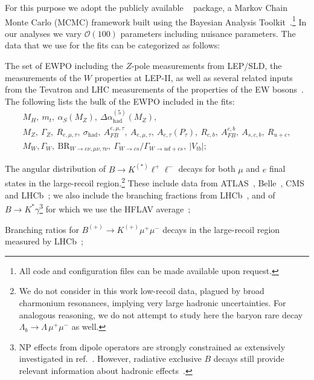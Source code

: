 For this purpose we adopt the publicly available \HEPfit~\cite{deBlas:2019okz} package, a Markov Chain Monte Carlo (MCMC) framework built using the Bayesian Analysis Toolkit~\cite{2009CoPhC.180.2197C}.\footnote{All code and configuration files can be made available upon request.} In our analyses we vary $\mathcal{O}(100)$ parameters including nuisance parameters. The data that we use for the fits can be categorized as follows:
\begin{itemize}
	\setlength\itemsep{0em}
	{\item The set of EWPO including the $Z$-pole measurements from LEP/SLD, the measurements of the $W$ properties at LEP-II, as well as several related inputs from the Tevatron and LHC measurements of the properties of the EW bosons~\cite{ALEPH:2005ab,Abe:2000uc,Group:2012gb,Schael:2013ita,Aaboud:2017svj,Khachatryan:2014iya,Abazov:2011ws}. The following lists the bulk of the EWPO included in the fits:
		\begin{gather*}
			M_H,~m_t,~\alpha_S(M_Z),~\Delta \alpha_{\mathrm{had}}^{(5)}(M_Z),\\
			M_{Z},~\Gamma_{Z},~R_{e,\mu,\tau},~\sigma_{\mathrm{had}}, ~A^{e,\mu,\tau}_{FB},~A_{e,\mu,\tau},~A_{e,\tau}(P_\tau),~ R_{c,b},~A^{c,b}_{FB},~A_{s,c,b},~R_{u+c}, \\
			M_{W},\Gamma_{W},~\mathrm{BR}_{W\to e \nu,\mu \nu,\tau \nu},~\Gamma_{W\to cs}/\Gamma_{W\to ud+cs},~\left|V_{tb}\right|;
		\end{gather*}
	}
	\item The angular distribution of $B\to K^{(*)}\ell^+\ell^-$ decays for both $\mu$ and $e$ final states in the large-recoil region.\footnote{We do not consider in this work low-recoil data, plagued by broad charmonium resonances, implying very large hadronic uncertainties. For analogous reasoning, we do not attempt to study here the baryon rare decay $\Lambda_{b} \to  \Lambda \, \mu^{+} \mu^{-}$ as well.} These include data from ATLAS~\cite{Aaboud:2018krd}, Belle~\cite{Wehle:2016yoi}, CMS~\cite{Khachatryan:2015isa,Sirunyan:2017dhj} and LHCb~\cite{Aaij:2015dea,Aaij:2020nrf}; we also include the branching fractions from LHCb~\cite{Aaij:2016flj}, and of $B\to K^*\gamma$\footnote{NP effects from dipole operators are strongly constrained as extensively investigated in ref.~\cite{Paul:2016urs}. However, radiative exclusive $B$ decays still provide relevant information about hadronic effects~\cite{Ciuchini:2018anp}.} for which we use the HFLAV average~\cite{Amhis:2019ckw};
	\item Branching ratios for $B^{(+)} \to K^{(+)} \mu^+\mu^-$ decays in the large-recoil region measured by LHCb~\cite{Aaij:2014pli};

\end{itemize}
